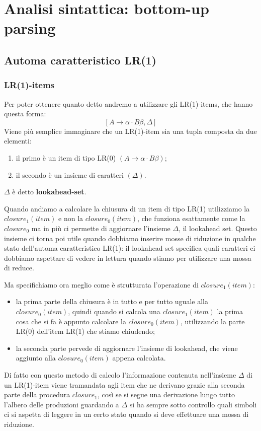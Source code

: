\documentclass[class=book, crop=false, oneside, 12pt]{standalone}
\begin{document}
\chapter{Analisi sintattica: bottom-up parsing}

\section{Automa caratteristico LR(1)}

\subsection{LR(1)-items}
Per poter ottenere quanto detto andremo a utilizzare gli LR(1)-items, che hanno questa forma:
\begin{equation}
    \label{lr0}
    [A \to \alpha \cdot B \beta, \Delta]
\end{equation}
Viene più semplice immaginare che un LR(1)-item sia una tupla composta da due elementi:
\begin{enumerate}
    \item il primo è un item di tipo LR(0) \((A \to \alpha \cdot B \beta)\);
    \item il secondo è un insieme di caratteri \((\Delta)\).
\end{enumerate} 
\(\Delta\) è detto \textbf{lookahead-set}.

Quando andiamo a calcolare la chiusura di un item di tipo LR(1) utilizziamo la \(closure_1(item)\) e non la \(closure_0(item)\), che funziona esattamente come la \(closure_0\) ma in più ci permette di aggiornare l'insieme \(\Delta\), il lookahead set. Questo insieme ci torna poi utile quando dobbiamo inserire mosse di riduzione in qualche stato dell'automa caratteristico LR(1): il lookahead set specifica quali caratteri ci dobbiamo aspettare di vedere in lettura quando stiamo per utilizzare una mossa di reduce.

Ma specifichiamo ora meglio come è strutturata l'operazione di \(closure_1(item)\):
\begin{itemize}
    \item la prima parte della chiusura è in tutto e per tutto uguale alla \(closure_0(item)\), quindi quando si calcola una \(closure_1(item)\) la prima cosa che si fa è appunto calcolare la \(closure_0(item)\), utilizzando la parte LR(0) dell'item LR(1) che stiamo chiudendo;
    \item la seconda parte pervede di aggiornare l'insieme di lookahead, che viene aggiunto alla \(closure_0(item)\) appena calcolata.  
\end{itemize}
Di fatto con questo metodo di calcolo l'informazione contenuta nell'insieme \(\Delta\) di un LR(1)-item viene tramandata agli item che ne derivano grazie alla seconda parte della procedura \(closure_1\), così se si segue una derivazione lungo tutto l'albero delle produzioni guardando a \(\Delta\) si ha sempre sotto controllo quali simboli ci si aspetta di leggere in un certo stato quando si deve effettuare una mossa di riduzione.
\end{document}
